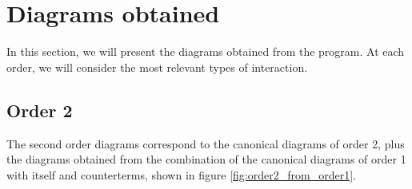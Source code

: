 \documentclass[11pt,a4paper,twoside,pdf]{article}
\numberwithin{equation}{section}
\begin{document}
\newpage

\section{Diagrams obtained} \label{sec:diagrams}

In this section, we will present the diagrams obtained from the program. At 
each order, we will consider the most relevant types of interaction.

\subsection{Order 2}
The second order diagrams correspond to the canonical diagrams of order 2,
plus the diagrams obtained from the combination of the canonical diagrams of order 1 with 
itself and counterterms, shown in figure \ref{fig:order2_from_order1}.
\end{document}
